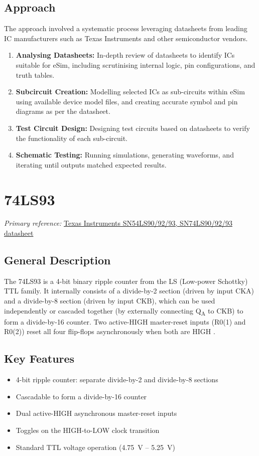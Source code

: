 \documentclass[12pt,a4paper]{report}
\newcommand{\datasheetref}[2]{%
  \noindent\textit{Primary reference:} \href{#2}{#1}%
  \par\vspace{0.6em}
}
\begin{document}
\section{Approach}
The approach involved a systematic process leveraging datasheets from
leading IC manufacturers such as Texas Instruments and other
semiconductor vendors.

\begin{enumerate}
  \item \textbf{Analysing Datasheets:} In-depth review of datasheets to
    identify ICs suitable for eSim, including scrutinising internal logic,
    pin configurations, and truth tables.
  \item \textbf{Subcircuit Creation:} Modelling selected ICs as
    sub-circuits within eSim using available device model files, and
    creating accurate symbol and pin diagrams as per the datasheet.
  \item \textbf{Test Circuit Design:} Designing test circuits based on
    datasheets to verify the functionality of each sub-circuit.
  \item \textbf{Schematic Testing:} Running simulations, generating
    waveforms, and iterating until outputs matched expected results.
\end{enumerate}

\chapter{74LS93}
\datasheetref{Texas Instruments SN54LS90/92/93, SN74LS90/92/93 datasheet}{https://www.ti.com/lit/ds/symlink/sn74ls93.pdf}

\section{General Description}
The 74LS93 is a 4-bit binary ripple counter from the LS (Low-power
Schottky) TTL family. It internally consists of a divide-by-2 section
(driven by input CKA) and a divide-by-8 section (driven by input CKB),
which can be used independently or cascaded together (by externally
connecting Q\textsubscript{A} to CKB) to form a divide-by-16 counter.
Two active-HIGH master-reset inputs (R0(1) and R0(2)) reset all four
flip-flops asynchronously when both are HIGH \cite{ls93}.

\section{Key Features}
\begin{itemize}
  \item 4-bit ripple counter: separate divide-by-2 and divide-by-8 sections
  \item Cascadable to form a divide-by-16 counter
  \item Dual active-HIGH asynchronous master-reset inputs
  \item Toggles on the HIGH-to-LOW clock transition
  \item Standard TTL voltage operation (4.75~V -- 5.25~V)
\end{itemize}
\end{document}

